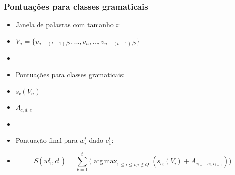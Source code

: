 \documentclass[10pt]{beamer}
\DeclareMathOperator*{\argmax}{arg\,max}
\begin{document}
\begin{frame}[fragile]
\frametitle{Pontuações para classes gramaticais}


  \begin{itemize}

    \item Janela de palavras com tamanho $t$:

    \item[\ ] $V_n = \big\{ v_{n - (t-1)/2}, ..., v_n, ..., v_{{n + (t-1)/2}} \big\} $

    \item[\ ] \ 

    \item Pontuações para classes gramaticais:

    \item[\ ] $s_c(V_n)$

    \item[\ ] $A_{c,d,e}$

    \item[\ ] \ 

    \item Pontuação final para $w_i^t$ dado $c_1^t$:

    \item[\ ] \begin{equation} 
S(w_1^t, c_1^t) = \sum\limits_{k=1}^{t} \Big( \argmax_{1 \leq i \leq t, i \notin Q} (s_{c_i}(V_i) + A_{c_{i-1}, c_{i}, c_{i+1}}) \Big) \nonumber
\end{equation}



  \end{itemize}

\end{frame}
\end{document}
